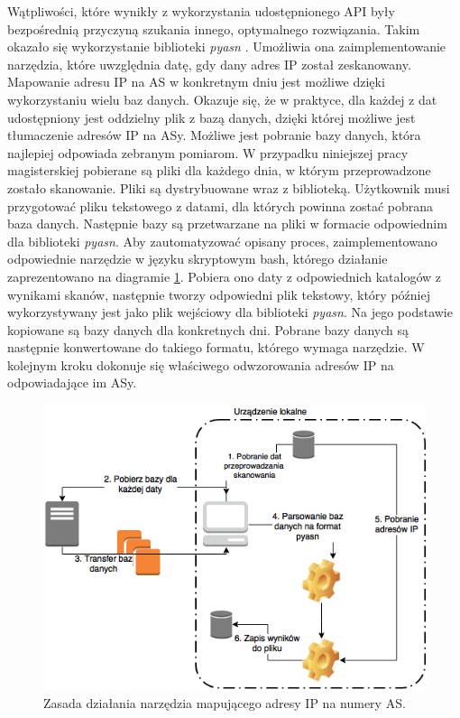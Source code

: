 Wątpliwości, które wynikły z wykorzystania udostępnionego API były bezpośrednią przyczyną szukania innego, optymalnego rozwiązania.
Takim okazało się wykorzystanie biblioteki \textit{pyasn} \cite{pyasn}. Umożliwia ona zaimplementowanie narzędzia, które uwzględnia
datę, gdy dany adres IP został zeskanowany. Mapowanie adresu IP na AS w konkretnym dniu jest możliwe dzięki wykorzystaniu wielu baz
danych. Okazuje się, że w praktyce, dla każdej z dat udostępniony jest oddzielny plik z bazą danych, dzięki której możliwe jest
tłumaczenie adresów IP na ASy. Możliwe jest pobranie bazy danych, która najlepiej odpowiada zebranym pomiarom. W przypadku niniejszej
pracy magisterskiej pobierane są pliki dla każdego dnia, w którym przeprowadzone zostało skanowanie. Pliki są dystrybuowane wraz z
biblioteką. Użytkownik musi przygotować pliku tekstowego z datami, dla których powinna zostać
pobrana baza danych. Następnie bazy są przetwarzane na pliki w formacie odpowiednim dla biblioteki \textit{pyasn}. Aby zautomatyzować
opisany proces, zaimplementowano odpowiednie narzędzie w języku skryptowym bash, którego działanie zaprezentowano na diagramie
\ref{fig:netcat}. Pobiera ono daty z odpowiednich katalogów z wynikami
skanów, następnie tworzy odpowiedni plik tekstowy, który później wykorzystywany jest jako plik wejściowy dla biblioteki \textit{pyasn}.
Na jego podstawie kopiowane są bazy danych dla konkretnych dni. Pobrane bazy danych są następnie konwertowane do takiego formatu,
którego wymaga narzędzie. W kolejnym kroku dokonuje się właściwego odwzorowania adresów IP na odpowiadające im ASy.
\begin{figure}[h]
	\centering
	\includegraphics[width=1.0\textwidth]{image/netcat}
	\caption{Zasada działania narzędzia mapującego adresy IP na numery AS.}
	\label{fig:netcat}
\end{figure}


